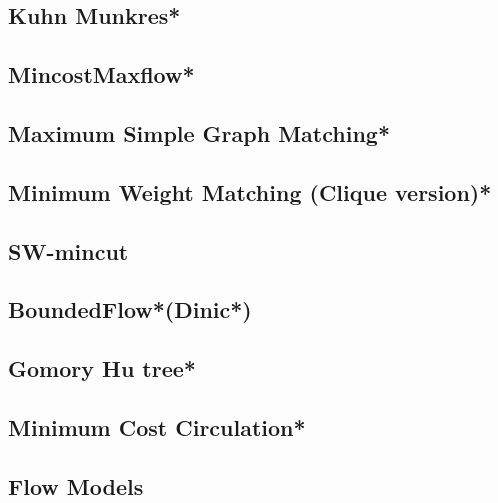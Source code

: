 \subsection{Kuhn Munkres*} %

\subsection{MincostMaxflow*} %

\subsection{Maximum Simple Graph Matching*} %

\subsection{Minimum Weight Matching (Clique version)*} %

\subsection{SW-mincut}

\subsection{BoundedFlow*(Dinic*)} %

\subsection{Gomory Hu tree*} %

\subsection{Minimum Cost Circulation*} %

\subsection{Flow Models}

% 


